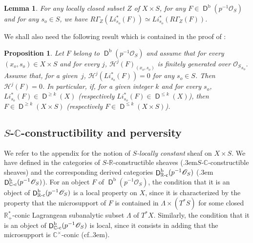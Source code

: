 \documentclass[english]{smfart}
\numberwithin{subsection}{section}
\def\shh{\mathcal{H}}
\def\shh{\mathcal{H}}
\def\sho{\mathcal{O}}\let\cO\sho
\newcommand{\C}{\mathbb{C}}\let\CC\C
\newcommand{\R}{\mathbb{R}}\let\RR\R
\newcommand{\rb}{\mathrm{b}}
\newcommand{\Mod}{\mathrm{Mod}}
\newcommand{\cc}{{\C\textup{-c}}}
\newcommand{\rc}{{\R\textup{-c}}}
\newcommand{\XS}{X\times S}
\DeclareMathOperator{\rD}{\mathsf{D}}
\let\leq\leqslant
\let\geq\geqslant
\def\cf{cf.\kern.3em}
\def\resp{\text{resp.}\kern.3em}
\newcommand{\sbullet}{{\scriptscriptstyle\bullet}}
\newcommand{\pOS}{p^{-1}\sho_S}
\numberwithin{equation}{section}
\theoremstyle{plain}
\newtheorem{proposition}[equation]{Proposition}
\newtheorem{lemma}[equation]{Lemma}
\theoremstyle{definition}
\def\To#1{\mathchoice{\xrightarrow{\textstyle\kern4pt#1\kern3pt}}{\stackrel{#1}{\longrightarrow}}{}{}}
\begin{document}
\begin{lemma}\label{RGamma}
For any locally closed subset $Z$ of $\XS$, for any $F\in \rD^\rb(\pOS)$ and for any $s_o\in S$, we have $R\Gamma_Z(Li^*_{s_o}(F))\simeq Li^*_{s_o}(R\Gamma_Z(F))$.
\end{lemma}

\begin{comment}
\begin{proof}
The category $\Mod(\pOS)$ admits enough injective objects. Arguing by induction on $\dim S$, we may assume that $\dim S=1$ and that $S$ is an open subset of $\C$ with a coordinate $s$ vanishing at $s_o$. Thus, replacing $F$ by an injective resolution $F^{\sbullet}$,
$Li^*_{s_o} (R\Gamma_Z(F))$ is given by the simple complex associated to $\Gamma_Z(F^{\sbullet})\To{s}\Gamma_Z(F^{\sbullet})$. On the other hand, we have
$$Li^*_{s_o}(F)\simeq \{F^{\sbullet}\To{s} F^{\sbullet}\}.$$ The injectivity of $F^{\sbullet}$ then entails that $R\Gamma_Z(Li^*_{s_o}(F))$ is quasi-isomorphic to $\Gamma_Z(F^{\sbullet})\To{s}\Gamma_Z(F^{\sbullet})$ as desired.
\end{proof}
\end{comment}

We shall also need the following result which is contained in the proof of \cite[Prop.\,2.2]{MF-S12}:

\begin{proposition}\label{P:1}
Let $F$ belong to $\rD^\rb(\pOS)$ and assume that for every $(x_o,s_o)\in \XS$ and for every $j$, $\shh^j(F)_{(x_o,s_o)}$ is finitely generated over ${\sho_S}_{s_o}$. Assume that, for a given~$j$, $\shh^j(Li^*_{s_o} (F))=0$ for any $s_o\in S$. Then $\shh^j(F)=0$. In particular, if, for a given integer $k$ and for every $s_o$, $Li^*_{s_o} (F)\in \rD^{\geq k}(X)$ (respectively $Li^*_{s_o} (F)\in \rD^{\leq k}(X)$), then $F\in \rD^{\geq k}(\XS)$ (respectively $F\in \rD^{\leq k}(\XS)$).
\end{proposition}

\subsection{$S$-$\C$-constructibility and perversity}\label{subsec:Sconstructible}

We refer to the appendix for the notion of \emph{$S$-locally constant} sheaf on $\XS$. We have defined in \cite{MF-S12} the categories of $S$-$\R$-constructible sheaves (\resp $S$-$\C$-constructible sheaves) and the corresponding derived categories $\rD^\rb_\rc(\pOS)$ (\resp $\rD^\rb_\cc(\pOS)$). For an object $F$ of $\rD^\rb(\pOS)$, the condition that it is an object of $\rD^\rb_\rc(\pOS)$ is a local property on $X$, since it is characterized by the property that the microsupport of $F$ is contained in $\Lambda\times(T^*S)$ for some closed $\RR_+^*$-conic Lagrangean subanalytic subset $\Lambda$ of $T^*X$. Similarly, the condition that it is an object of $\rD^\rb_\cc(\pOS)$ is local, since it consists in adding that the microsupport is $\CC^\times$-conic (\cf \cite[Prop.\,2.5 \& Def.\,2.19]{MF-S12}).
\end{document}
